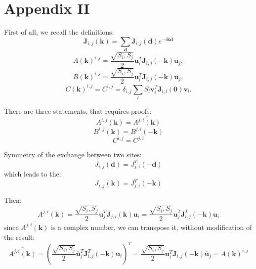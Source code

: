 \section{Appendix II}

First of all, we recall the definitions:
\begin{equation}
    \boldsymbol{J}_{i,j}(\boldsymbol{k}) = \sum_{\boldsymbol{d}}\boldsymbol{J}_{i,j}(\boldsymbol{d})e^{-i\boldsymbol{k}\boldsymbol{d}}
\end{equation}
\begin{equation}
    A(\boldsymbol{k})^{i,j} = \dfrac{\sqrt{S_i, S_j}}{2}\boldsymbol{u}^T_i\boldsymbol{J}_{i,j}(-\boldsymbol{k})\overline{\boldsymbol{u}}_j,
\end{equation}
\begin{equation}
    B(\boldsymbol{k})^{i,j} = \dfrac{\sqrt{S_i, S_j}}{2}\boldsymbol{u}^T_i\boldsymbol{J}_{i,j}(-\boldsymbol{k})\boldsymbol{u}_j,
\end{equation}
\begin{equation}
    C(\boldsymbol{k})^{i,j} = C^{i,j} = \delta_{i,j}\sum_{l}S_l \boldsymbol{v}^T_i\boldsymbol{J}_{i, l}(\boldsymbol{0})\boldsymbol{v}_l.
\end{equation}

There are three statements, that requires proofs:
\begin{equation}
    A^{i,j}(\boldsymbol{k}) = \overline{A^{j,i}(\boldsymbol{k})}
\end{equation}
\begin{equation}
    B^{i,j}(\boldsymbol{k}) = B^{j,i}(-\boldsymbol{k})
\end{equation}
\begin{equation}
    C^{i,j} = C^{j,i}
\end{equation}

Symmetry of the exchange between two sites:
\begin{equation}
    J_{i,j}(\boldsymbol{d}) = J_{j,i}^T(-\boldsymbol{d})
\end{equation}
which leads to the:
\begin{equation}
    J_{i,j}(\boldsymbol{k}) = J_{j,i}^T(-\boldsymbol{k})
\end{equation}

Then:
\begin{equation}
    \overline{A^{j,i}(\boldsymbol{k})} = \dfrac{\sqrt{S_i, S_j}}{2}\overline{\boldsymbol{u}}^T_j\boldsymbol{J}_{j,i}(\boldsymbol{k})\boldsymbol{u}_i = 
    \dfrac{\sqrt{S_i, S_j}}{2}\overline{\boldsymbol{u}}^T_j\boldsymbol{J}_{i,j}^T(-\boldsymbol{k})\boldsymbol{u}_i
\end{equation}
since $\overline{A^{j,i}(\boldsymbol{k})}$ is a complex number, we can transpose it, without modification of the result:
\begin{equation}
    \overline{A^{j,i}(\boldsymbol{k})} =  (\dfrac{\sqrt{S_i, S_j}}{2}\overline{\boldsymbol{u}}^T_j\boldsymbol{J}_{i,j}^T(-\boldsymbol{k})\boldsymbol{u}_i)^T =
    \dfrac{\sqrt{S_i, S_j}}{2}\boldsymbol{u}^T_i\boldsymbol{J}_{i,j}(-\boldsymbol{k})\overline{\boldsymbol{u}}_j = A(\boldsymbol{k})^{i,j}
\end{equation}


